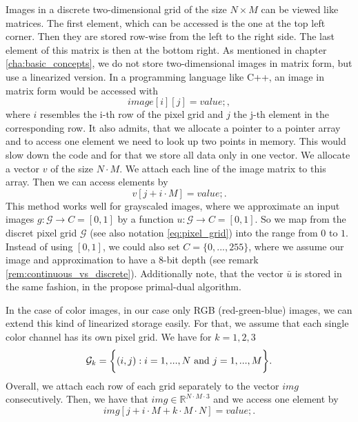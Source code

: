 \documentclass{scrreprt}
\begin{document}
        Images in a discrete two-dimensional grid of the size $N \times M$ can be viewed like matrices. The first element, which can be accessed is the one at the top left corner. Then they are stored row-wise from the left to the right side. The last element of this matrix is then at the bottom right. As mentioned in chapter \ref{cha:basic_concepts}, we do not store two-dimensional images in matrix form, but use a linearized version. In a programming language like C++, an image in matrix form would be accessed with
            $$
                image[i][j] = value;,
            $$
        where $i$ resembles the i-th row of the pixel grid and $j$ the j-th element in the corresponding row. It also admits, that we allocate a pointer to a pointer array and to access one element we need to look up two points in memory. This would slow down the code and for that we store all data only in one vector. We allocate a vector $v$ of the size $N \cdot M$. We attach each line of the image matrix to this array. Then we can access elements by
            $$
                v[j + i \cdot M] = value;.
            $$
        This method works well for grayscaled images, where we approximate an input images $g: \mathcal{G} \longrightarrow C = [0, 1]$ by a function $u: \mathcal{G} \longrightarrow C = [0, 1]$. So we map from the discret pixel grid $\mathcal{G}$ (see also notation \ref{eq:pixel_grid}) into the range from $0$ to $1$. Instead of using $[0, 1]$, we could also set $C = \{ 0, ..., 255 \}$, where we assume our image and approximation to have a 8-bit depth (see remark \ref{rem:continuous_vs_discrete}). Additionally note, that the vector $\bar{u}$ is stored in the same fashion, in the propose primal-dual algorithm.

        In the case of color images, in our case only RGB (red-green-blue) images, we can extend this kind of linearized storage easily. For that, we assume that each single color channel has its own pixel grid. We have for $k = 1, 2, 3$
            \begin{equation}
                \mathcal{G}_{k} = \bigg\{ (i, j) : i = 1, ..., N \,\, \textnormal{and} \,\, j = 1, ..., M \bigg\}.
                \label{eq:color_pixel_grid}
            \end{equation}
        Overall, we attach each row of each grid separately to the vector $img$ consecutively. Then, we have that $img \in \mathbb{R}^{N \cdot M \cdot 3}$ and we access one element by
            $$
                img[j + i \cdot M + k \cdot M \cdot N] = value;.
            $$
\end{document}
